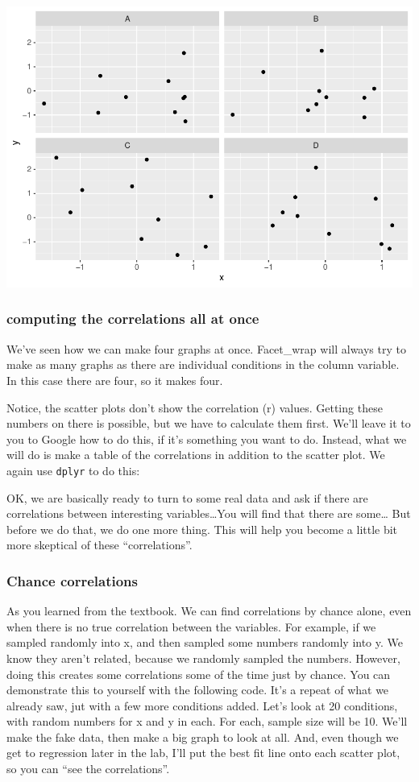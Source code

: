 \documentclass[]{book}
\begin{document}
\includegraphics{Statistics_Lab_files/figure-latex/unnamed-chunk-67-1.pdf}

\subsubsection{computing the correlations all at
once}\label{computing-the-correlations-all-at-once}

We've seen how we can make four graphs at once. Facet\_wrap will always
try to make as many graphs as there are individual conditions in the
column variable. In this case there are four, so it makes four.

Notice, the scatter plots don't show the correlation (r) values. Getting
these numbers on there is possible, but we have to calculate them first.
We'll leave it to you to Google how to do this, if it's something you
want to do. Instead, what we will do is make a table of the correlations
in addition to the scatter plot. We again use \texttt{dplyr} to do this:

OK, we are basically ready to turn to some real data and ask if there
are correlations between interesting variables\ldots{}You will find that
there are some\ldots{} But before we do that, we do one more thing. This
will help you become a little bit more skeptical of these
``correlations''.

\subsubsection{Chance correlations}\label{chance-correlations}

As you learned from the textbook. We can find correlations by chance
alone, even when there is no true correlation between the variables. For
example, if we sampled randomly into x, and then sampled some numbers
randomly into y. We know they aren't related, because we randomly
sampled the numbers. However, doing this creates some correlations some
of the time just by chance. You can demonstrate this to yourself with
the following code. It's a repeat of what we already saw, jut with a few
more conditions added. Let's look at 20 conditions, with random numbers
for x and y in each. For each, sample size will be 10. We'll make the
fake data, then make a big graph to look at all. And, even though we get
to regression later in the lab, I'll put the best fit line onto each
scatter plot, so you can ``see the correlations''.
\end{document}
